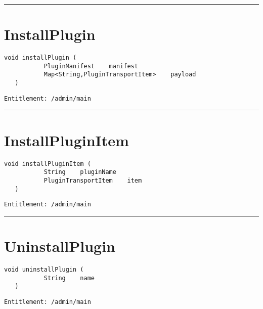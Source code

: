 \rule{12cm}{2pt}
\section{InstallPlugin}
\label{Api:InstallPlugin}
\begin{lstlisting}[style=nonumbers]
   void installPlugin (
           PluginManifest    manifest
           Map<String,PluginTransportItem>    payload
   )
\end{lstlisting}
\begin{Verbatim}[formatcom=\color{Maroon}]
  Entitlement: /admin/main
\end{Verbatim}



\rule{12cm}{2pt}
\section{InstallPluginItem}
\label{Api:InstallPluginItem}
\begin{lstlisting}[style=nonumbers]
   void installPluginItem (
           String    pluginName
           PluginTransportItem    item
   )
\end{lstlisting}
\begin{Verbatim}[formatcom=\color{Maroon}]
  Entitlement: /admin/main
\end{Verbatim}



\rule{12cm}{2pt}
\section{UninstallPlugin}
\label{Api:UninstallPlugin}
\begin{lstlisting}[style=nonumbers]
   void uninstallPlugin (
           String    name
   )
\end{lstlisting}
\begin{Verbatim}[formatcom=\color{Maroon}]
  Entitlement: /admin/main
\end{Verbatim}



